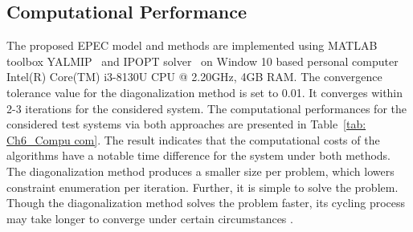 \documentclass[journal]{IEEEtran}
\begin{document}
\vspace{-2mm}
\subsection{Computational Performance }
The proposed EPEC model and methods are implemented using MATLAB\textsuperscript{\textregistered} toolbox YALMIP~\mbox{\cite{lofberg2004yalmip}} and IPOPT solver~\mbox{\cite{wachter2006implementation}} on Window 10 based personal computer Intel(R) Core(TM) i3-8130U CPU @ 2.20GHz, 4GB RAM. The convergence tolerance value for the diagonalization method is set to 0.01. It converges within 2-3 iterations for the considered system.  The computational performances for the considered test systems via both approaches are presented in Table~\mbox{\ref{tab: Ch6_Compu com}}. The result indicates that the computational costs of the algorithms have a notable time difference for the system under both methods. The diagonalization method produces a smaller size per problem, which lowers constraint enumeration per iteration. Further, it is simple to solve the problem. Though the diagonalization method solves the problem faster, its cycling process may take longer to converge under certain circumstances {\cite{haghighat2012bilevel}}.
\end{document}
